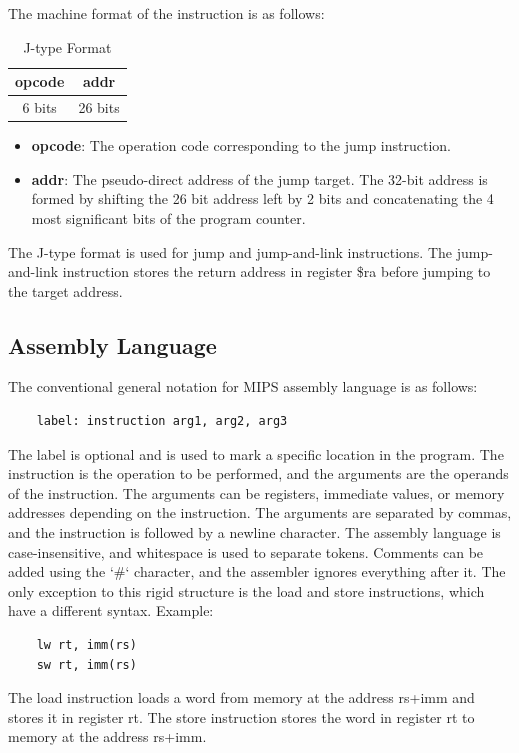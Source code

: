 The machine format of the instruction is as follows:
\begin{table}[H]
    \centering
    \begin{tabular}{|c|c|}
    \hline
    \textbf{opcode} & \textbf{addr} \\ \hline
    6 bits         & 26 bits      \\ \hline
    \end{tabular}
    \caption{J-type Format}
    \label{tab:j_type_format}
\end{table}

\begin{itemize}
    \item \textbf{opcode}: The operation code corresponding to the jump instruction.
    \item \textbf{addr}: The pseudo-direct address of the jump target. The 32-bit address is formed by shifting the 26 bit address left by 2 bits and concatenating the 4 most significant bits of the program counter.
\end{itemize}
The J-type format is used for jump and jump-and-link instructions. The jump-and-link instruction stores the return address in register \$ra before jumping to the target address.

\subsection{Assembly Language}
The conventional general notation for MIPS assembly language is as follows:
\begin{verbatim}
    label: instruction arg1, arg2, arg3
\end{verbatim}
The label is optional and is used to mark a specific location in the program. The instruction is the operation to be performed, and the arguments are the operands of the instruction. The arguments can be registers, immediate values, or memory addresses depending on the instruction. The arguments are separated by commas, and the instruction is followed by a newline character. The assembly language is case-insensitive, and whitespace is used to separate tokens. Comments can be added using the `\#` character, and the assembler ignores everything after it. The only exception to this rigid structure is the load and store instructions, which have a different syntax. Example: 
\begin{verbatim}
    lw rt, imm(rs)
    sw rt, imm(rs)
\end{verbatim}
The load instruction loads a word from memory at the address rs+imm and stores it in register rt. The store instruction stores the word in register rt to memory at the address rs+imm.

